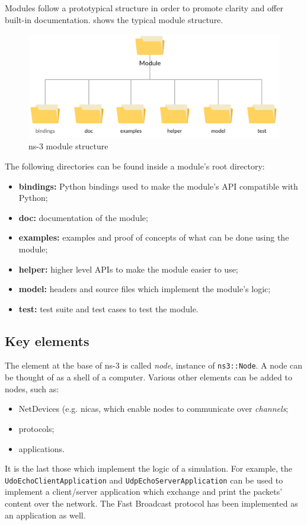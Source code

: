 	
	Modules follow a prototypical structure in order to promote clarity and offer built-in documentation.  shows the typical module structure.
	
	\begin{figure}[H]
		\centering
		\includegraphics[width=\textwidth]{immagini/ns-3-module}
		\caption{ns-3 module structure}
		\label{fig:ns-3-module}
	\end{figure}
	
	The following directories can be found inside a module's root directory:
	\begin{itemize}
		\item \textbf{bindings:} Python bindings used to make the module's API compatible with Python;
		\item \textbf{doc:} documentation of the module;
		\item \textbf{examples:} examples and proof of concepts of what can be done using the module;
		\item \textbf{helper:} higher level APIs to make the module easier to use;
		\item \textbf{model:} headers and source files which implement the module's logic; 
		\item \textbf{test:} test suite and test cases to test the module.
	\end{itemize}
	
	\subsection{Key elements}
	The element at the base of ns-3 is called \textit{node}, instance of \texttt{ns3::Node}. A node can be thought of as a shell of a computer. Various other elements can be added to nodes, such as:
	\begin{itemize}
		\item NetDevices (e.g. \acrshort{nica}s, which enable nodes to communicate over \textit{channels};
		\item protocols;
		\item applications. 
	\end{itemize}
	It is the last those which implement the logic of a simulation. For example, the \texttt{UdoEchoClientApplication} and \texttt{UdpEchoServerApplication} can be used to implement a client/server application which exchange and print the packets' content over the network. The Fast Broadcast protocol has been implemented as an application as well.
	
